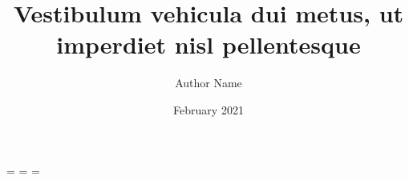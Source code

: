 \documentclass[fontsize=13bp,oneside,print]{proposal}
\title{Vestibulum vehicula dui metus, ut imperdiet nisl pellentesque}
\author{Author Name}
\date{February 2021}
\begin{document}
\newdimen\origiwspc
\newdimen\origiwstr
\origiwspc=\font %
\origiwstr=\font %
\font=\origiwstr
{}\origiwspc %



\begingroup
\mainmatter






\endgroup




\end{document}
